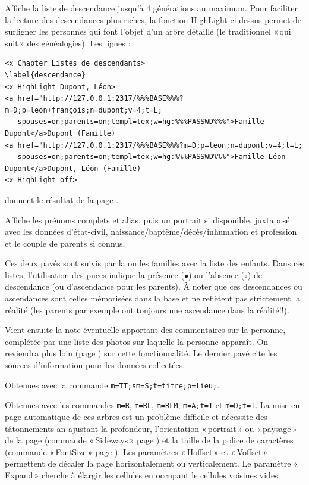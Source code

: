 \begin{description}[style=nextline]
\item[Liste de descendance] Affiche la liste de descendance jusqu'à 4
générations au maximum. Pour faciliter la lecture des descendances plus riches,
la fonction HighLight ci-dessus permet de surligner les personnes
qui font l'objet d'un arbre détaillé (le traditionnel «\,qui suit\,» des généalogies).
Les lignes :
\begin{verbatim}
<x Chapter Listes de descendants>
\label{descendance}
<x HighLight Dupont, Léon>
<a href="http://127.0.0.1:2317/%%%BASE%%%?m=D;p=leon+françois;n=dupont;v=4;t=L;
   spouses=on;parents=on;templ=tex;w=hg:%%%PASSWD%%%">Famille Dupont</a>Dupont (Famille)
<a href="http://127.0.0.1:2317/%%%BASE%%%?m=D;p=leon;n=dupont;v=4;t=L;
   spouses=on;parents=on;templ=tex;w=hg:%%%PASSWD%%%">Famille Léon Dupont</a>Dupont, Léon (Famille)
<x HighLight off>
\end{verbatim}
donnent le résultat de la page \pageref{descendance}.

\item[Page perso] Affiche les prénoms complets et alias, puis
un portrait si disponible, juxtaposé avec les
données d'état-civil, naissance/baptême/décès/inhumation et profession
et le couple de parents si connus.

Ces deux pavés sont suivis par la ou les familles avec la liste des enfants.
Dans ces listes, l'utilisation des puces indique la présence ($\bullet$)
ou l'absence ($\circ$) de descendance (ou d'ascendance pour les parents).
À noter que ces descendances ou ascendances sont celles mémorisées dans la base
et ne reflètent pas strictement la réalité (les parents par exemple ont toujours
une ascendance dans la réalité!!).

Vient ensuite la note éventuelle apportant des commentaires sur la personne,
complétée par une liste des photos sur laquelle la personne apparaît.
On reviendra plus loin (page \pageref{images}) sur cette fonctionnalité.
Le dernier pavé cite les sources d'information pour les données collectées.

\item[Liste par titre] Obtenues avec la commande
\verb|m=TT;sm=S;t=titre;p=lieu;|.

\item[Arbres] Obtenues avec les commandes \verb|m=R|, \verb|m=RL|, \verb|m=RLM|,
\verb|m=A;t=T| et \verb|m=D;t=T|.
La mise en page automatique de ces arbres est un problème difficile et
nécessite des tâtonnements an ajustant la profondeur, l'orientation «\,portrait\,»
ou «\,paysage\,» de la page (commande «\,Sideways\,» page \pageref{sideways}) et la
taille de la police de caractères (commande «\,FontSize\,» page \pageref{fontsize}).
Les paramètres «\,Hoffset\,» et «\,Voffset\,» permettent de décaler la page
horizontalement ou verticalement. Le paramètre «\,Expand\,» cherche à élargir
les cellules en occupant le cellules voisines vides.


\end{description}
